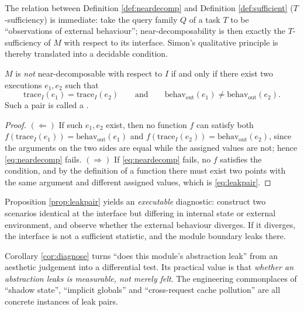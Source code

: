 The relation between Definition \ref{def:neardecomp} and Definition \ref{def:sufficient}
($T$-sufficiency) is immediate: take the query family $Q$ of a task $T$ to be
``observations of external behaviour''; near-decomposability is then exactly the
$T$-sufficiency of $M$ with respect to its interface. Simon's qualitative principle is
thereby translated into a decidable condition.

\begin{proposition}\label{prop:leakpair}
$M$ is \emph{not} near-decomposable with respect to $I$ if and only if there exist two
executions $e_1, e_2$ such that
\begin{equation}\label{eq:leakpair}
\mathrm{trace}_I(e_1) = \mathrm{trace}_I(e_2)
\qquad\text{and}\qquad
\mathrm{behav}_{\mathrm{out}}(e_1) \ne \mathrm{behav}_{\mathrm{out}}(e_2).
\end{equation}
Such a pair is called a .
\end{proposition}

\begin{proof}
$(\Leftarrow)$ If such $e_1, e_2$ exist, then no function $f$ can satisfy both
$f(\mathrm{trace}_I(e_1)) = \mathrm{behav}_{\mathrm{out}}(e_1)$ and
$f(\mathrm{trace}_I(e_2)) = \mathrm{behav}_{\mathrm{out}}(e_2)$, since the arguments on the
two sides are equal while the assigned values are not; hence \eqref{eq:neardecomp} fails.
$(\Rightarrow)$ If \eqref{eq:neardecomp} fails, no $f$ satisfies the condition, and by the
definition of a function there must exist two points with the same argument and different
assigned values, which is \eqref{eq:leakpair}.
\end{proof}

\begin{corollary}\label{cor:diagnose}
Proposition \ref{prop:leakpair} yields an \emph{executable} diagnostic: construct two
scenarios identical at the interface but differing in internal state or external
environment, and observe whether the external behaviour diverges. If it diverges, the
interface is not a sufficient statistic, and the module boundary leaks there.
\end{corollary}

Corollary \ref{cor:diagnose} turns ``does this module's abstraction leak'' from an aesthetic
judgement into a differential test. Its practical value is that \emph{whether an abstraction
leaks is measurable, not merely felt}. The engineering commonplaces of ``shadow state'',
``implicit globals'' and ``cross-request cache pollution'' are all concrete instances of
leak pairs.

